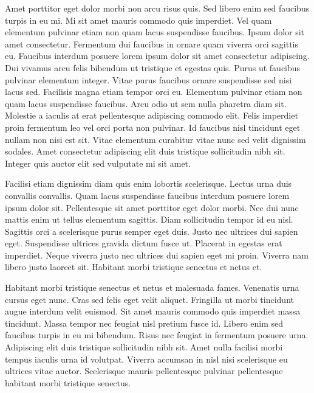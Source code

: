 Amet porttitor eget dolor morbi non arcu risus quis. Sed libero enim sed
faucibus turpis in eu mi. Mi sit amet mauris commodo quis imperdiet. Vel quam
elementum pulvinar etiam non quam lacus suspendisse faucibus. Ipsum dolor sit
amet consectetur. Fermentum dui faucibus in ornare quam viverra orci sagittis
eu. Faucibus interdum posuere lorem ipsum dolor sit amet consectetur adipiscing.
Dui vivamus arcu felis bibendum ut tristique et egestas quis. Purus ut faucibus
pulvinar elementum integer. Vitae purus faucibus ornare suspendisse sed nisi
lacus sed. Facilisis magna etiam tempor orci eu. Elementum pulvinar etiam non
quam lacus suspendisse faucibus. Arcu odio ut sem nulla pharetra diam sit.
Molestie a iaculis at erat pellentesque adipiscing commodo elit. Felis imperdiet
proin fermentum leo vel orci porta non pulvinar. Id faucibus nisl tincidunt eget
nullam non nisi est sit. Vitae elementum curabitur vitae nunc sed velit
dignissim sodales. Amet consectetur adipiscing elit duis tristique sollicitudin
nibh sit. Integer quis auctor elit sed vulputate mi sit amet.

Facilisi etiam dignissim diam quis enim lobortis scelerisque. Lectus urna duis
convallis convallis. Quam lacus suspendisse faucibus interdum posuere lorem
ipsum dolor sit. Pellentesque sit amet porttitor eget dolor morbi. Nec dui nunc
mattis enim ut tellus elementum sagittis. Diam sollicitudin tempor id eu nisl.
Sagittis orci a scelerisque purus semper eget duis. Justo nec ultrices dui
sapien eget. Suspendisse ultrices gravida dictum fusce ut. Placerat in egestas
erat imperdiet. Neque viverra justo nec ultrices dui sapien eget mi proin.
Viverra nam libero justo laoreet sit. Habitant morbi tristique senectus et netus
et.

Habitant morbi tristique senectus et netus et malesuada fames. Venenatis urna
cursus eget nunc. Cras sed felis eget velit aliquet. Fringilla ut morbi
tincidunt augue interdum velit euismod. Sit amet mauris commodo quis imperdiet
massa tincidunt. Massa tempor nec feugiat nisl pretium fusce id. Libero enim sed
faucibus turpis in eu mi bibendum. Risus nec feugiat in fermentum posuere urna.
Adipiscing elit duis tristique sollicitudin nibh sit. Amet nulla facilisi morbi
tempus iaculis urna id volutpat. Viverra accumsan in nisl nisi scelerisque eu
ultrices vitae auctor. Scelerisque mauris pellentesque pulvinar pellentesque
habitant morbi tristique senectus.
